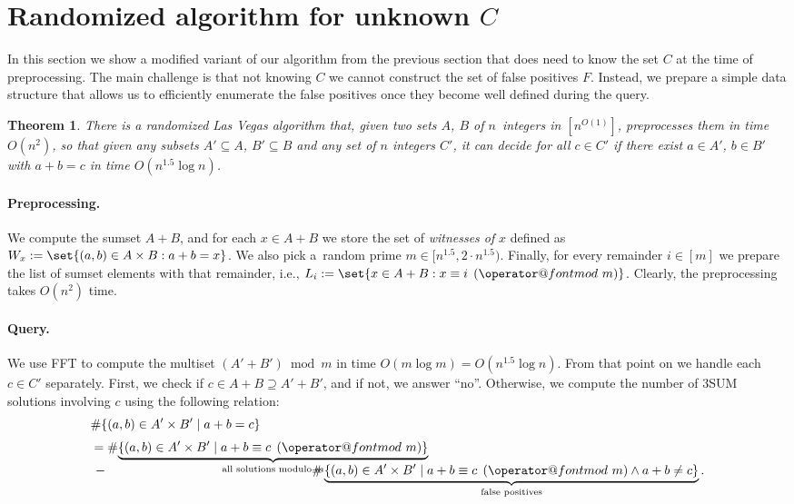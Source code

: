 \documentclass[10pt,a4paper]{article}
\makeatletter
\newtheorem{theorem}{Theorem}[section]
\newcommand{\tpmod}[1]{\mkern 8mu({\operator@font mod}\mkern 6mu#1)}
\makeatother
\begin{document}
\section{Randomized algorithm for unknown \texorpdfstring{$C$}{C}}
\label{sec:unknowncrnd}

In this section we show a modified variant of our algorithm from the previous section that does need to know the set $C$ at the time of preprocessing. The main challenge is that not knowing $C$ we cannot construct the set of false positives $F$. Instead, we prepare a simple data structure that allows us to efficiently enumerate the false positives once they become well defined during the query.

\begin{theorem}\label{thm:unknowncrnd}
    There is a randomized Las Vegas algorithm that,
    given two sets $A$, $B$ of $n$~integers in $[n^{O(1)}]$, preprocesses them in time $O(n^2)$, so that given any subsets $A' \subseteq A$, $B' \subseteq B$ and any set of $n$ integers $C'$, it can decide for all $c \in C'$ if there exist $a \in A'$, $b \in B'$ with $a+b=c$ in time $O(n^{1.5} \log n)$.
\end{theorem}

\paragraph{Preprocessing.}
We compute the sumset $A+B$, and for each $x \in A+B$ we store the set of \emph{witnesses of} $x$ defined as $W_x := \set{ (a, b) \in A \times B : a + b = x}$. We also pick a~random prime $m \in [n^{1.5}, 2\cdot n^{1.5})$. Finally, for every remainder $i \in [m]$ we prepare the list of sumset elements with that remainder, i.e., $L_i := \set{x \in A+B : x \equiv i \tpmod{m}}$. Clearly, the preprocessing takes $O(n^2)$ time.

\paragraph{Query.}
We use FFT to compute the multiset $(A'+B') \bmod m$ in time $O(m \log m) = O(n^{1.5} \log n)$. From that point on we handle each $c \in C'$ separately. First, we check if $c \in A + B \supseteq A' + B'$, and if not, we answer ``no''. Otherwise, we compute the number of 3SUM solutions involving $c$ using the following relation:
\begin{align*}
& \# \{(a,b) \in A' \times B' \mid a+b=c\} \\[.3em]
& = \# \smash{\underbrace{\{(a,b) \in A' \times B' \mid a + b \equiv c \tpmod{m}\}}_{\text{all solutions modulo $m$}}} \\[.3em]
&\, - \hspace{16em} \# \underbrace{\{(a,b) \in A' \times B' \mid a + b \equiv c \tpmod{m} \land a + b \neq c\}}_{\text{false positives}}.
\end{align*}
\end{document}
